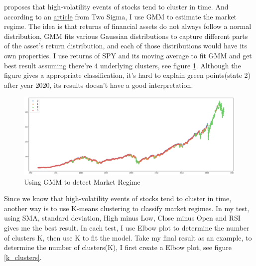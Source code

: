 \documentclass[a4paper,12pt]{article}
\begin{document}
\cite{cont_empirical_nodate} proposes that high-volatility events of stocks tend to cluster in time. And according to an \href{https://www.twosigma.com/articles/a-machine-learning-approach-to-regime-modeling/}{article} from Two Sigma, I use GMM to estimate the market regime. The idea is that returns of financial assets do not always follow a normal distribution, GMM fits various Gaussian distributions to capture different parts of the asset’s return distribution, and each of those distributions would have its own properties. I use returns of SPY and its moving average to fit GMM and get best result assuming there're 4 underlying clusters, see figure \ref{gmm_figure}. Although the figure gives a appropriate classification, it's hard to explain green points(state 2) after year 2020,  its results doesn't have a good interpretation.

\begin{figure}[H]
    \includegraphics[scale=0.3]{GMM_tech_indic.png}
    \caption{Using GMM to detect Market Regime}\label{gmm_figure}
\end{figure}

Since we know that high-volatility events of stocks tend to cluster in time, another way is to use K-means clustering to classify market regimes. In my test, using SMA, standard deviation, High minus Low, Close minus Open and RSI gives me the best result. In each test, I use Elbow plot to determine the number of clusters K, then use K to fit the model. Take my final result as an example, to determine the number of clusters(K), I first create a Elbow plot, see figure \ref{k_clusters}.
\end{document}
